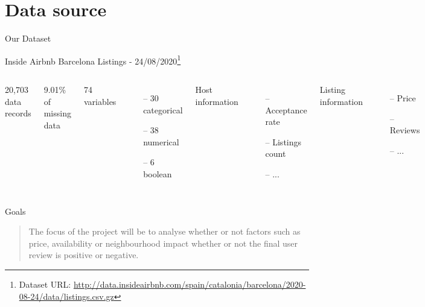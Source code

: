 \section{Data source}
\begin{frame}{Our Dataset}
\begin{center}
    Inside Airbnb Barcelona Listings - 24/08/2020\footnote[frame]{Dataset URL: \url{http://data.insideairbnb.com/spain/catalonia/barcelona/2020-08-24/data/listings.csv.gz}}

\vspace{5 mm}

\begin{columns}[t]
    20,703 data records
    
    9.01\% of missing data
    
    74 variables
    \small
    \begin{itemize}[topsep=0pt]
        \itemsep-0.25em
    	\item[--] 30 categorical
    	\item[--] 38 numerical
    	\item[--] 6 boolean
    \end{itemize}
    \normalsize
    
    Host information
    \small
    \begin{itemize}[topsep=0pt]
        \itemsep-0.5em
    	\item[--] Acceptance rate
    	\item[--] Listings count
    	\item[--] ...
    \end{itemize}
    \normalsize
    Listing information
    \small
    \begin{itemize}[topsep=0pt]
        \itemsep-0.5em
    	\item[--] Price
    	\item[--] Reviews
    	\item[--] ...
    \end{itemize}
    \normalsize
\end{columns}

\end{center}
\end{frame}


\begin{frame}{Goals}
\begin{quote}
The focus of the project will be to analyse whether or not factors
such as price, availability or neighbourhood impact whether or not the final
user review is positive or negative.
\end{quote}
\end{frame}

